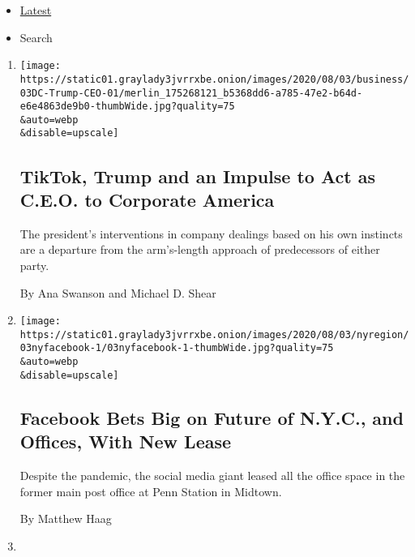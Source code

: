 \begin{itemize}
\tightlist
\item
  \protect\hyperlink{stream-panel}{Latest}
\item
  Search
\end{itemize}

\begin{enumerate}
\def\labelenumi{\arabic{enumi}.}
\item
  \href{/2020/08/03/business/economy/trump-tiktok-china-business.html}{}

  \texttt{[image: https://static01.graylady3jvrrxbe.onion/images/2020/08/03/business/03DC-Trump-CEO-01/merlin\_175268121\_b5368dd6-a785-47e2-b64d-e6e4863de9b0-thumbWide.jpg?quality=75\\\&auto=webp\\\&disable=upscale]}

  \hypertarget{tiktok-trump-and-an-impulse-to-act-as-ceo-to-corporate-america}{%
  \subsection{TikTok, Trump and an Impulse to Act as C.E.O. to Corporate
  America}\label{tiktok-trump-and-an-impulse-to-act-as-ceo-to-corporate-america}}

  The president's interventions in company dealings based on his own
  instincts are a departure from the arm's-length approach of
  predecessors of either party.

  By Ana Swanson and Michael D. Shear
\item
  \href{/2020/08/03/nyregion/facebook-nyc-office-farley-building.html}{}

  \texttt{[image: https://static01.graylady3jvrrxbe.onion/images/2020/08/03/nyregion/03nyfacebook-1/03nyfacebook-1-thumbWide.jpg?quality=75\\\&auto=webp\\\&disable=upscale]}

  \hypertarget{facebook-bets-big-on-future-of-nyc-and-offices-with-new-lease}{%
  \subsection{Facebook Bets Big on Future of N.Y.C., and Offices, With
  New
  Lease}\label{facebook-bets-big-on-future-of-nyc-and-offices-with-new-lease}}

  Despite the pandemic, the social media giant leased all the office
  space in the former main post office at Penn Station in Midtown.

  By Matthew Haag
\item
  \href{/2020/08/03/technology/trump-tiktok-microsoft.html}{}


\end{enumerate}
